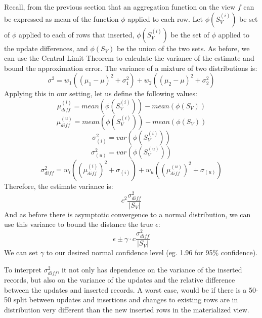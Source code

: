 Recall, from the previous section that an aggregation function on the view $f$ can be expressed as mean of the function $\phi$ applied to each row.
Let $\phi(S_{V}^{(i)})$ be set of $\phi$ applied to each of rows that inserted, $\phi(S_{V}^{(i)})$ be the set of $\phi$ applied to the update differences, and $\phi(S_{V})$ be the union of the two sets.
As before, we can use the Central Limit Theorem to calculate the variance of the estimate and bound the approximation error.
The variance of a mixture of two distributions is:
\[
\sigma^2 = w_1((\mu_1-\mu)^2 + \sigma^2_1) + w_2((\mu_2-\mu)^2 + \sigma^2_2)
\]
Applying this in our setting, let us define the following values:
\[
\mu^{(i)}_{diff} = mean(\phi(S_{V}^{(i)})) - mean(\phi(S_{V}))
\]
\[
\mu^{(u)}_{diff} = mean(\phi(S_{V}^{(i)})) - mean(\phi(S_{V}))
\]
\[
\sigma^2_{(i)} = var(\phi(S_{V}^{(i)}))
\]
\[
\sigma^2_{(u)} = var(\phi(S_{V}^{(u)}))
\]
\[
\sigma^2_{diff} = w_i((\mu^{(i)}_{diff})^2 + \sigma_{(i)}) + w_u((\mu^{(u)}_{diff})^2 + \sigma_{(u)})
\] 
Therefore, the estimate variance is:
\[
c^2\frac{\sigma^2_{diff}}{|S_{V}|}
\]
And as before there is asymptotic convergence to a normal distribution, we can use this variance to bound the distance the true $\epsilon$:   
\[
\epsilon \pm \gamma \cdot c\frac{\sigma^2_{diff}}{|S_{V}|}
\]
We can set $\gamma$ to our desired normal confidence level (eg. 1.96 for 95\% confidence).

To interpret $\sigma^2_{diff}$, it not only has dependence on the variance of the inserted records, but also on the variance of the updates and the relative difference between the updates and inserted records. 
A worst case, would be if there is a 50-50 split between updates and insertions and changes to existing rows are in distribution very different than the new inserted rows in the materialized view. 
\fi
